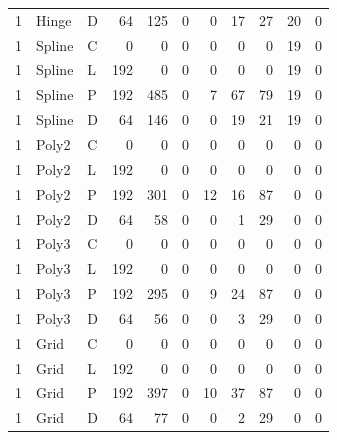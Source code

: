 \begin{longtable}{lllrrrrrrrr}
1 & Hinge & D & 64 & 125 & 0 & 0 & 17 & 27 & 20 & 0 \\
1 & Spline & C & 0 & 0 & 0 & 0 & 0 & 0 & 19 & 0 \\
1 & Spline & L & 192 & 0 & 0 & 0 & 0 & 0 & 19 & 0 \\
1 & Spline & P & 192 & 485 & 0 & 7 & 67 & 79 & 19 & 0 \\
1 & Spline & D & 64 & 146 & 0 & 0 & 19 & 21 & 19 & 0 \\
1 & Poly2 & C & 0 & 0 & 0 & 0 & 0 & 0 & 0 & 0 \\
1 & Poly2 & L & 192 & 0 & 0 & 0 & 0 & 0 & 0 & 0 \\
1 & Poly2 & P & 192 & 301 & 0 & 12 & 16 & 87 & 0 & 0 \\
1 & Poly2 & D & 64 & 58 & 0 & 0 & 1 & 29 & 0 & 0 \\
1 & Poly3 & C & 0 & 0 & 0 & 0 & 0 & 0 & 0 & 0 \\
1 & Poly3 & L & 192 & 0 & 0 & 0 & 0 & 0 & 0 & 0 \\
1 & Poly3 & P & 192 & 295 & 0 & 9 & 24 & 87 & 0 & 0 \\
1 & Poly3 & D & 64 & 56 & 0 & 0 & 3 & 29 & 0 & 0 \\
1 & Grid & C & 0 & 0 & 0 & 0 & 0 & 0 & 0 & 0 \\
1 & Grid & L & 192 & 0 & 0 & 0 & 0 & 0 & 0 & 0 \\
1 & Grid & P & 192 & 397 & 0 & 10 & 37 & 87 & 0 & 0 \\
1 & Grid & D & 64 & 77 & 0 & 0 & 2 & 29 & 0 & 0 \\
\end{longtable}
\endgroup


